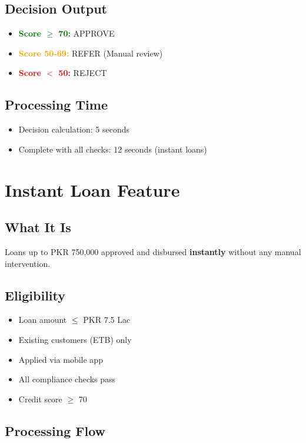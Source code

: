 \documentclass[11pt,a4paper]{article}
\begin{document}
\subsection{Decision Output}
\begin{itemize}[leftmargin=*]
    \item \textcolor{green}{\textbf{Score $\geq$ 70:}} APPROVE
    \item \textcolor{orange}{\textbf{Score 50-69:}} REFER (Manual review)
    \item \textcolor{red}{\textbf{Score $<$ 50:}} REJECT
\end{itemize}

\subsection{Processing Time}
\begin{itemize}[leftmargin=*]
    \item Decision calculation: 5 seconds
    \item Complete with all checks: 12 seconds (instant loans)
\end{itemize}

\newpage

\section{Instant Loan Feature}

\subsection{What It Is}
Loans up to PKR 750,000 approved and disbursed \textbf{instantly} without any manual intervention.

\subsection{Eligibility}
\begin{itemize}[leftmargin=*]
    \item Loan amount $\leq$ PKR 7.5 Lac
    \item Existing customers (ETB) only
    \item Applied via mobile app
    \item All compliance checks pass
    \item Credit score $\geq$ 70
\end{itemize}

\subsection{Processing Flow}
\end{document}
